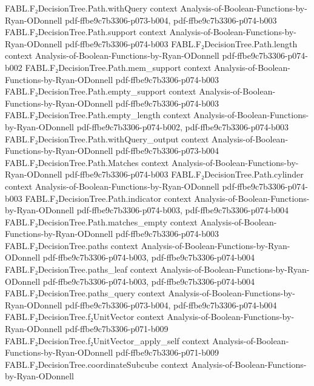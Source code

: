 \begin{theorem}
\proofstep
  {FABL.F₂DecisionTree.Path.withQuery}
  {context}
  {Analysis-of-Boolean-Functions-by-Ryan-ODonnell}
  {pdf-ffbe9c7b3306-p073-b004,
    pdf-ffbe9c7b3306-p074-b003}
\proofstep
  {FABL.F₂DecisionTree.Path.support}
  {context}
  {Analysis-of-Boolean-Functions-by-Ryan-ODonnell}
  {pdf-ffbe9c7b3306-p074-b003}
\proofstep
  {FABL.F₂DecisionTree.Path.length}
  {context}
  {Analysis-of-Boolean-Functions-by-Ryan-ODonnell}
  {pdf-ffbe9c7b3306-p074-b002}
\proofstep
  {FABL.F₂DecisionTree.Path.mem_support}
  {context}
  {Analysis-of-Boolean-Functions-by-Ryan-ODonnell}
  {pdf-ffbe9c7b3306-p074-b003}
\proofstep
  {FABL.F₂DecisionTree.Path.empty_support}
  {context}
  {Analysis-of-Boolean-Functions-by-Ryan-ODonnell}
  {pdf-ffbe9c7b3306-p074-b003}
\proofstep
  {FABL.F₂DecisionTree.Path.empty_length}
  {context}
  {Analysis-of-Boolean-Functions-by-Ryan-ODonnell}
  {pdf-ffbe9c7b3306-p074-b002,
    pdf-ffbe9c7b3306-p074-b003}
\proofstep
  {FABL.F₂DecisionTree.Path.withQuery_output}
  {context}
  {Analysis-of-Boolean-Functions-by-Ryan-ODonnell}
  {pdf-ffbe9c7b3306-p073-b004}
\proofstep
  {FABL.F₂DecisionTree.Path.Matches}
  {context}
  {Analysis-of-Boolean-Functions-by-Ryan-ODonnell}
  {pdf-ffbe9c7b3306-p074-b003}
\proofstep
  {FABL.F₂DecisionTree.Path.cylinder}
  {context}
  {Analysis-of-Boolean-Functions-by-Ryan-ODonnell}
  {pdf-ffbe9c7b3306-p074-b003}
\proofstep
  {FABL.F₂DecisionTree.Path.indicator}
  {context}
  {Analysis-of-Boolean-Functions-by-Ryan-ODonnell}
  {pdf-ffbe9c7b3306-p074-b003,
    pdf-ffbe9c7b3306-p074-b004}
\proofstep
  {FABL.F₂DecisionTree.Path.matches_empty}
  {context}
  {Analysis-of-Boolean-Functions-by-Ryan-ODonnell}
  {pdf-ffbe9c7b3306-p074-b003}
\proofstep
  {FABL.F₂DecisionTree.paths}
  {context}
  {Analysis-of-Boolean-Functions-by-Ryan-ODonnell}
  {pdf-ffbe9c7b3306-p074-b003,
    pdf-ffbe9c7b3306-p074-b004}
\proofstep
  {FABL.F₂DecisionTree.paths_leaf}
  {context}
  {Analysis-of-Boolean-Functions-by-Ryan-ODonnell}
  {pdf-ffbe9c7b3306-p074-b003,
    pdf-ffbe9c7b3306-p074-b004}
\proofstep
  {FABL.F₂DecisionTree.paths_query}
  {context}
  {Analysis-of-Boolean-Functions-by-Ryan-ODonnell}
  {pdf-ffbe9c7b3306-p073-b004,
    pdf-ffbe9c7b3306-p074-b004}
\proofstep
  {FABL.F₂DecisionTree.f₂UnitVector}
  {context}
  {Analysis-of-Boolean-Functions-by-Ryan-ODonnell}
  {pdf-ffbe9c7b3306-p071-b009}
\proofstep
  {FABL.F₂DecisionTree.f₂UnitVector_apply_self}
  {context}
  {Analysis-of-Boolean-Functions-by-Ryan-ODonnell}
  {pdf-ffbe9c7b3306-p071-b009}
\proofstep
  {FABL.F₂DecisionTree.coordinateSubcube}
  {context}
  {Analysis-of-Boolean-Functions-by-Ryan-ODonnell}

\end{theorem}
